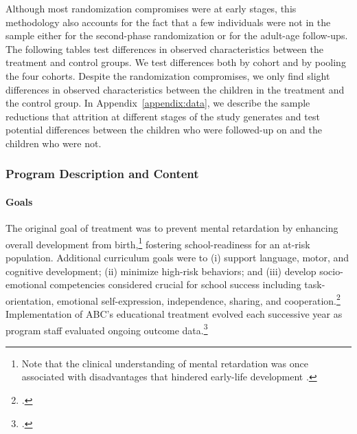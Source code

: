\begin{appendices}
\noindent Although most randomization compromises were at early stages, this methodology also accounts for the fact that a few individuals were not in the sample either for the second-phase randomization or for the adult-age follow-ups. The following tables test differences in observed characteristics between the treatment and control groups. We test differences both by cohort and by pooling the four cohorts. Despite the randomization compromises, we only find slight differences in observed characteristics between the children in the treatment and the control group. In Appendix~\ref{appendix:data}, we describe the sample reductions that attrition at different stages of the study generates and test potential differences between the children who were followed-up on and the children who were not.\\

\subsubsection{Program Description and Content}

\paragraph{Goals}
\noindent The original goal of treatment was to prevent mental retardation by enhancing overall development from birth,\footnote{Note that the clinical understanding of mental retardation was once associated with disadvantages that hindered early-life development \citep{Mental-Retardation_America_2004_BOOK_NYU}.} fostering school-readiness for an at-risk population. Additional curriculum goals were to (i) support language, motor, and cognitive development; (ii) minimize high-risk behaviors; and (iii) develop socio-emotional competencies considered crucial for school success including task-orientation, emotional self-expression, independence, sharing, and cooperation.\footnote{\citet{Sparling_1974_Synth_Edu_Infant_SPEECH,Ramey_Collier_etal_1976_CarolinaAbecedarianProject,Ramey-etal_2012-ABC}.} Implementation of ABC's educational treatment evolved each successive year as program staff evaluated ongoing outcome data.\footnote{ \citet{McGinness_1982_Language-Poverty-Child,Haskins_1985_CD,Finkelstein_1982_Day_Care_YC,Ramey-etal_1975_AJoMD}.}\\



\end{appendices}
